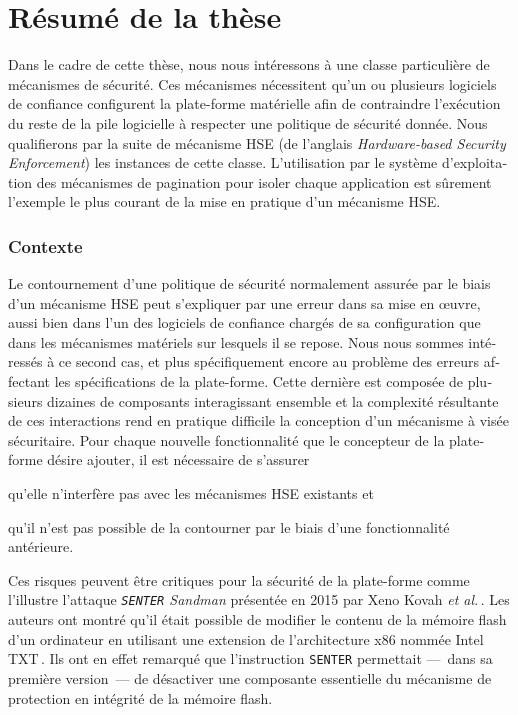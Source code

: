 \chapter{Résumé de la thèse}

\begin{otherlanguage}{french}
  Dans le cadre de cette thèse, nous nous intéressons à une classe particulière
  de mécanismes de sécurité. Ces mécanismes nécessitent qu'un ou plusieurs logiciels de confiance configurent la plate-forme matérielle afin de contraindre l’exécution du reste de la pile logicielle à
  respecter une politique de sécurité donnée.
  Nous qualifierons par la suite de mécanisme HSE (de l’anglais
  \emph{Hardware-based Security Enforcement}) les instances de cette
  classe.
  L’utilisation par le système d’exploitation des mécanismes de pagination pour
  isoler chaque application est sûrement l’exemple le plus courant de la mise en
  pratique d’un mécanisme HSE.

  \subsection*{Contexte}

  Le contournement d’une politique de sécurité normalement assurée par le biais
  d’un mécanisme HSE peut s’expliquer par une erreur dans sa mise en œuvre,
  aussi bien dans l’un des logiciels de confiance chargés de sa configuration que
  dans les mécanismes matériels sur lesquels il se repose.
  Nous nous sommes intéressés à ce second cas, et plus spécifiquement encore au
  problème des erreurs affectant les spécifications de la plate-forme.
  Cette dernière est composée de plusieurs dizaines de composants interagissant
  ensemble et la complexité résultante de ces interactions rend en pratique
  difficile la conception d’un mécanisme à visée sécuritaire.
  Pour chaque nouvelle fonctionnalité que le concepteur de la plate-forme désire
  ajouter, il est nécessaire de s’assurer
  \begin{inparaenum}[(1)]
  \item qu’elle n’interfère pas avec les mécanismes HSE existants et
  \item qu'il n'est pas possible de la contourner par le biais d’une
    fonctionnalité antérieure.
  \end{inparaenum}
  Ces risques peuvent être critiques pour la sécurité de la plate-forme comme
  l'illustre l’attaque \emph{\texttt{SENTER} Sandman} présentée en 2015 par Xeno
  Kovah \emph{et al.}\,\cite{kovah2015senter}.
  Les auteurs ont montré qu’il était possible de modifier le contenu de la
  mémoire flash d’un ordinateur en utilisant une extension de l’architecture x86
  nommée Intel TXT\,\cite{intel2015txt}.
  Ils ont en effet remarqué que l’instruction \texttt{SENTER} permettait
  ---~dans sa première version~--- de désactiver une composante essentielle du
  mécanisme de protection en intégrité de la mémoire flash.


\end{otherlanguage}
